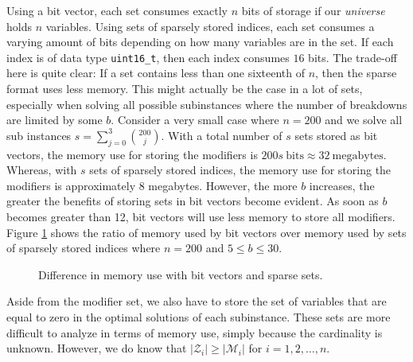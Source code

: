 Using a bit vector, each set consumes exactly $n$ bits of storage if our
\emph{universe} holds $n$ variables.
Using sets of sparsely stored indices, each set consumes a varying amount of
bits depending on how many variables are in the set. If each index is of data
type \texttt{uint16\_t}, then each index consumes $16$ bits. The trade-off
here is quite clear: If a set contains less than one sixteenth of $n$, then
the sparse format uses less memory. This might actually be the case in a lot
of sets, especially when solving all possible subinstances where the number
of breakdowns are limited by some $b$. Consider a very small case where
$n = 200$ and we solve all sub instances $s = \sum_{j=0}^{3} {200 \choose j}$.
With a total number of $s$ sets stored as bit vectors, the memory use for
storing the modifiers is $200s~\textrm{bits} \approx 32~\textrm{megabytes}$.
Whereas, with $s$ sets of sparsely stored indices, the memory use for storing
the modifiers is approximately $8$ megabytes. However, the more $b$ increases,
the greater the benefits of storing sets in bit vectors become evident. As soon
as $b$ becomes greater than 12, bit vectors will use less memory to store all
modifiers. Figure \ref{fig:bmem} shows the ratio of memory used by bit vectors
over memory used by sets of sparsely stored indices where $n = 200$ and
$5 \leq b \leq 30$.
\begin{figure}[h!]
\begin{center}
\end{center}
\caption{Difference in memory use with bit vectors and sparse sets.}
\label{fig:bmem}
\end{figure}
Aside from the modifier set, we also have to store the set of variables that
are equal to zero in the optimal solutions of each subinstance. These sets
are more difficult to analyze in terms of memory use, simply because the
cardinality is unknown. However, we do know that $|\mathcal{Z}_i| \geq
|\mathcal{M}_i|$ for $i=1,2,\ldots,n$.


